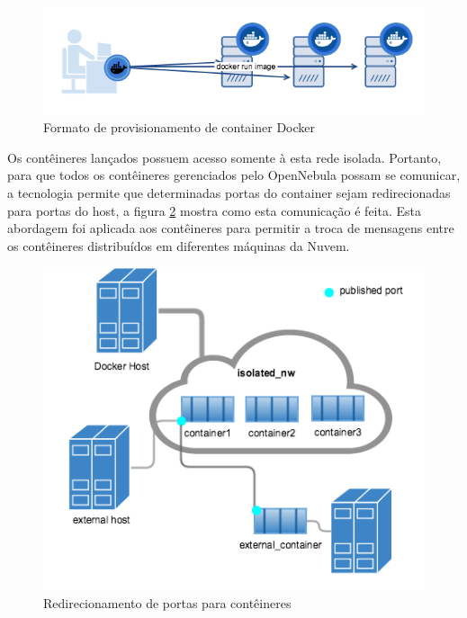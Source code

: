 \documentclass[twoside,english,brazilian]{UNISINOSartigo}
\begin{document}
\begin{itemize}
\begin{figure}
	\caption{Formato de provisionamento de container Docker}
	\label{fig:provision-use-case}
	\centering%
	\begin{minipage}{0.8\textwidth}
		\includegraphics[scale=0.6]{provision-use-case}
	\end{minipage}
\end{figure}


Os contêineres lançados possuem acesso somente à esta rede isolada. Portanto, para que todos os contêineres gerenciados pelo OpenNebula possam se comunicar, a tecnologia permite que determinadas portas do container sejam redirecionadas para portas do host, a figura \ref{fig:network_access} mostra como esta comunicação é feita. Esta abordagem foi aplicada aos contêineres para permitir a troca de mensagens entre os contêineres distribuídos em diferentes máquinas da Nuvem.
\begin{figure}
	\caption{Redirecionamento de portas para contêineres}
	\label{fig:network_access}
	\centering%
	\begin{minipage}{0.8\textwidth}
		\includegraphics[width=\textwidth]{network_access}
	\end{minipage}
\end{figure}



\end{itemize}
\end{document}
